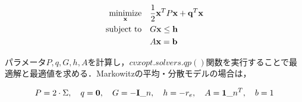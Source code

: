                                                                                                                                                 \begin{align}
                                                                                                                                                \underset{\bf x}{\rm minimize} ~~~ 
                                                                                                                                                &\frac{1}{2} {\bf x}^{T} P {\bf x} + {\bf q}^{T} {\bf x} \\
                                                                                                                                                {\rm subject~to} ~~~ & G {\bf x} \leq {\bf h} \\
                                                                                                                                                &A {\bf x} = {\bf b}
                                                                                                                                                \end{align}

                                                                                                                                                パラメータ$P,q,G,h,A$を計算し，$cvxopt.solvers.qp()$関数を実行することで最適解と最適値を求める．Markowitzの平均・分散モデルの場合は，

                                                                                                                                                \begin{align}
                                                                                                                                                    P = 2 \cdot \Sigma, \hspace{1em}
                                                                                                                                                        q = {\bf 0}, \hspace{1em}
                                                                                                                                                            G = - {\bf I}\_n, \hspace{1em}
                                                                                                                                                                h = - r_e, \hspace{1em}
                                                                                                                                                                    A = {\bf 1}\_n^T, \hspace{1em}
                                                                                                                                                                        b = 1
                                                                                                                                                                        \end{align}

